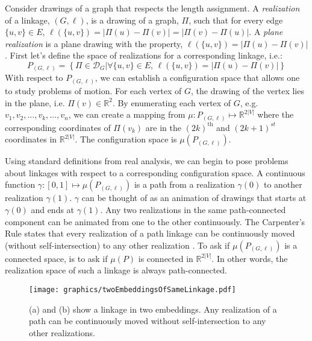 \documentclass[10pt]{CSUNthesis}
\theoremstyle{plain}%
\theoremstyle{definition}
\theoremstyle{remark}
\newcommand{\DD}{{\mathcal{D}}} %
\newcommand{\bbR}{{\mathbb{R}}}
\newcommand{\set}[2]{{\left\lbrace \left.  #1 \left\vert #2  \right.\right.\right\rbrace  }}
\newcommand{\lr}[1]{\left( #1 \right)}
\begin{document}
Consider drawings of a graph that respects the length assignment.  
A \textit{realization} of a linkage, $(G,\ell)$, is a drawing of a graph, $\Pi$, such that for every edge $\{u,v\} \in E$, $\ell\left( \{u,v\} \right) = \left\vert \Pi(u) - \Pi(v) \right\vert = \left\vert \Pi(v) - \Pi(u) \right\vert$. 
A \textit{plane realization} is a plane drawing with the property, $\ell\left( \{u,v\} \right) = \left\vert \Pi(u) - \Pi(v) \right\vert$.
First let's define the space of realizations for a corresponding linkage, i.e.:
$$P_{(G,\ell)} = \set{\Pi\in \DD_G }{\forall \{u,v\} \in E\text{, }\ell\left( \{u,v\} \right) = \left\vert \Pi(u) - \Pi(v) \right\vert}$$
With respect to $P_{(G,\ell)}$, we can establish a configuration space that allows one to study problems of motion.  
For each vertex of $G$, the drawing of the vertex lies in the plane, i.e. $\Pi(v) \in \bbR^2$.  
By enumerating each vertex of $G$, e.g. $v_1, v_2, \dots, v_k, \dots, v_{n}$, we can create a mapping from $\mu: P_{(G,\ell)} \mapsto \bbR^{2\vert V \vert}$ where the corresponding coordinates of $\Pi(v_k)$ are in the $(2k)^\text{th}$ and $(2k+1)^{st}$ coordinates in $\bbR^{2\vert V \vert}$.  
The configuration space is $\mu\lr{P_{(G,\ell)}}$.  

Using standard definitions from real analysis, we can begin to pose problems about linkages with respect to a corresponding configuration space.  
A continuous function $\gamma: [0,1]\mapsto \mu\lr{P_{(G,\ell)}}$ is a path from a realization $\gamma(0)$ to another realization $\gamma(1)$.
$\gamma$ can be thought of as an animation of drawings that starts at $\gamma(0)$ and ends at $\gamma(1)$.  
Any two realizations in the same path-connected component can be animated from one to the other continuously.
The Carpenter's Rule states that every realization of a path linkage can be continuously moved (without self-intersection) to any other realization \cite{CDR03,Str05}.
To ask if $\mu\lr{P_{(G,\ell)}}$ is a connected space, is to ask if $\mu(P)$ is connected in $\bbR^{2\vert V \vert}$.
In other words, the realization space of such a linkage is always path-connected.

\begin{figure}[!htbp]
\begin{center}
\texttt{[image: graphics/twoEmbeddingsOfSameLinkage.pdf]}
\end{center} 
\caption{(a) and (b) show a linkage in two embeddings.  Any realization of a path can be continuously moved without self-intersection to any other realizations.}
\label{fig:twoEmbeddingsOfSameLinkage.pdf}
\end{figure}
\end{document}
